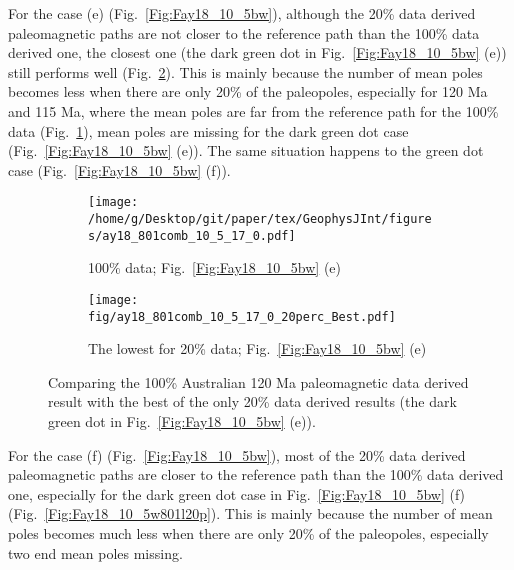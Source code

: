 For the case (e) (Fig.~\ref{Fig:Fay18_10_5bw}), although the 20\% data derived
paleomagnetic paths are not closer to the reference path than the 100\% data
derived one, the closest one (the dark green dot in Fig.~\ref{Fig:Fay18_10_5bw}
(e)) still performs well (Fig.~\ref{Fig:Fay18_10_5b801l20p}). This is mainly
because the number of mean poles becomes less when there are only 20\% of the
paleopoles, especially for 120 Ma and 115 Ma, where the mean poles are far from
the reference path for the 100\% data (Fig.~\ref{Fig:Fay18_10_5b801}), mean
poles are missing for the dark green dot case (Fig.~\ref{Fig:Fay18_10_5bw} (e)).
The same situation happens to the green dot case (Fig.~\ref{Fig:Fay18_10_5bw}
(f)).

\begin{figure*}[tbp]
  \captionsetup[subfigure]{labelformat=empty,aboveskip=-6pt,belowskip=-6pt}
  \centering
  \begin{subfigure}[htbp]{.49\textwidth}
    \captionsetup{skip=0pt}
    \centering
    \texttt{[image: /home/g/Desktop/git/paper/tex/GeophysJInt/figures/ay18\_801comb\_10\_5\_17\_0.pdf]}
	\caption{100\% data; Fig.~\ref{Fig:Fay18_10_5bw}
	(e)}\label{Fig:Fay18_10_5b801}
  \end{subfigure}
  \begin{subfigure}[htbp]{.49\textwidth}
    \captionsetup{skip=0pt}
    \centering
    \texttt{[image: fig/ay18\_801comb\_10\_5\_17\_0\_20perc\_Best.pdf]} %
    \caption{The lowest for 20\% data;
	Fig.~\ref{Fig:Fay18_10_5bw} (e)}\label{Fig:Fay18_10_5b801l20p}
  \end{subfigure}
  \caption[Less data, better similarity?]{Comparing the 100\% Australian
  120 Ma paleomagnetic data derived result with the best of the only
  20\% data derived results (the dark green dot in Fig.~\ref{Fig:Fay18_10_5bw}
  (e)).}\label{Fig:Fay18_10_5b801l20p_vs_100p}
\end{figure*}

For the case (f) (Fig.~\ref{Fig:Fay18_10_5bw}), most of the 20\% data derived
paleomagnetic paths are closer to the reference path than the 100\% data derived
one, especially for the dark green dot case in Fig.~\ref{Fig:Fay18_10_5bw} (f)
(Fig.~\ref{Fig:Fay18_10_5w801l20p}). This is mainly because the number of mean
poles becomes much less when there are only 20\% of the paleopoles, especially
two end mean poles missing.

